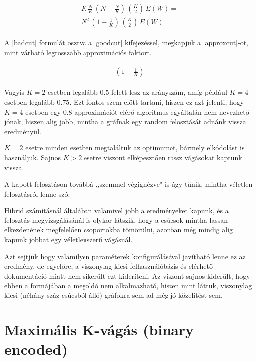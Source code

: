\begin{align}
	\begin{split}
		K \, \frac{N}{K} \, \left( N-\frac{N}{K} \right) \, \binom{K}{2} \, E(W) = \label{badcut} \\
		 N^2 \, \left( 1 -\frac{1}{K} \right) \,\binom{K}{2} \, E(W)
	\end{split}
\end{align}

A \ref{badcut} formulát osztva a \ref{goodcut} kifejezéssel, megkapjuk a \ref{approxcut}-ot, mint várható legrosszabb approximációs faktort.

\begin{align}
	\begin{split}
		\left( 1 -\frac{1}{K} \right) \label{approxcut}
	\end{split}
\end{align}

Vagyis $K=2$ esetben legalább $0.5$ felett lesz az arányszám, amíg például $K=4$ esetben legalább $0.75$. Ezt fontos szem előtt tartani, hiszen ez azt jelenti, hogy $K=4$ esetben egy $0.8$ approximációt elérő algoritmus egyáltalán nem nevezhető jónak, hiszen alig jobb, mintha a gráfnak egy random felosztását adnánk vissza eredményül.

$K=2$ esetre minden esetben megtaláltuk az optimumot, bármely elkódolást is használjuk.
Sajnos $K>2$ esetre viszont elképesztően rossz vágásokat kaptunk vissza.

A kapott felosztáson továbbá ,,szemmel végignézve" is úgy tűnik, mintha véletlen felosztásról lenne szó.

Hibrid számításnál általában valamivel jobb a eredményeket kapunk, és a felosztás megvizsgálásánál is olykor látszik, hogy a csúcsok mintha lassan elkezdenének megfelelően csoportokba tömörülni, azonban még mindig alig kapunk jobbat egy véletlenszerű vágásnál.


Azt sejtjük hogy valamilyen paraméterek konfigurálásával javítható lenne ez az eredmény, de egyelőre, a viszonylag kicsi felhasználóbázis és elérhető dokumentáció miatt nem sikerült ezt kideríteni. Az viszont sajnos kiderült, hogy ebben a formájában a megoldó nem alkalmazható, hiszen mint láttuk, viszonylag kicsi (néhány száz csúcsból álló) gráfokra sem ad még jó közelítést sem.

\section{Maximális K-vágás (binary encoded)}\label{sec:practiceBinary}

